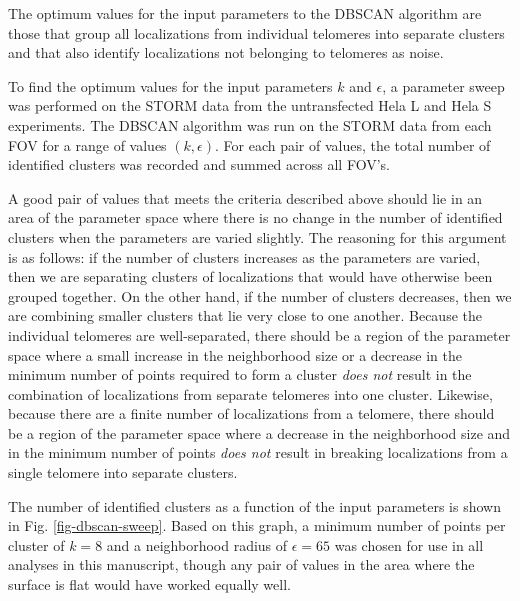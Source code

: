 \documentclass[12pt, a4paper]{article}
\begin{document}
The optimum values for the input parameters to the DBSCAN
algorithm are those that group all localizations from individual
telomeres into separate clusters and that also identify
localizations not belonging to telomeres as noise.

To find the optimum values for the input parameters $k$ and
$\epsilon$, a parameter sweep was performed on the STORM data from
the untransfected Hela L and Hela S experiments. The DBSCAN
algorithm was run on the STORM data from each FOV for a range of
values $\left ( k, \epsilon \right)$. For each pair of values, the
total number of identified clusters was recorded and summed across
all FOV's.

A good pair of values that meets the criteria described above
should lie in an area of the parameter space where there is no
change in the number of identified clusters when the parameters
are varied slightly. The reasoning for this argument is as
follows: if the number of clusters increases as the parameters are
varied, then we are separating clusters of localizations that
would have otherwise been grouped together. On the other hand, if
the number of clusters decreases, then we are combining smaller
clusters that lie very close to one another. Because the
individual telomeres are well-separated, there should be a region
of the parameter space where a small increase in the neighborhood
size or a decrease in the minimum number of points required to
form a cluster \emph{does not} result in the combination of
localizations from separate telomeres into one cluster. Likewise,
because there are a finite number of localizations from a
telomere, there should be a region of the parameter space where a
decrease in the neighborhood size and in the minimum number of
points \emph{does not} result in breaking localizations from a single
telomere into separate clusters.

The number of identified clusters as a function of the input
parameters is shown in Fig. \ref{fig-dbscan-sweep}. Based on this
graph, a minimum number of points per cluster of $k=8$ and a
neighborhood radius of $\epsilon = 65$ was chosen for use in all
analyses in this manuscript, though any pair of values in the area
where the surface is flat would have worked equally well.
\end{document}
